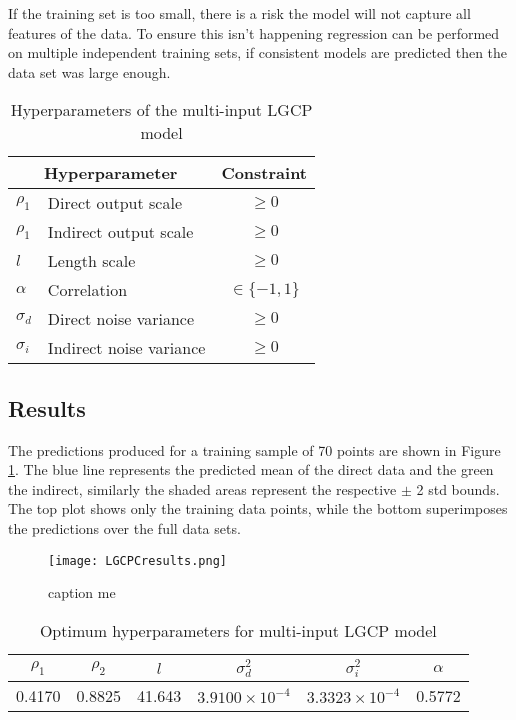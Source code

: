\documentclass[a4paper,11pt]{report}
\begin{document}
If the training set is too small, there is a risk the model will not capture all features of the data. To ensure this isn't happening regression can be performed on multiple independent training sets, if consistent models are predicted then the data set was large enough.


\begin{table}[]
\centering
\caption{Hyperparameters of the multi-input LGCP model}
\label{LGCPChyperparameters}
\begin{tabular}{ll|c}
\multicolumn{2}{c|}{\textbf{Hyperparameter}} & \textbf{Constraint} \\ \hline
\(\rho_1\)           & Direct output scale             & \(\geq0\)            \\
\(\rho_1\)             & Indirect output scale           & \(\geq0\)            \\
\(l\)          & Length scale                    & \(\geq0\)            \\
\(\alpha\)             & Correlation                     &  \(\in\{-1,1\}\)                   \\
\(\sigma_d\)             & Direct noise variance           &    \(\geq0\)                 \\
\(\sigma_i\)           & Indirect noise variance         &     \(\geq0\)               
\end{tabular}
\end{table}

\subsection{Results}
The predictions produced for a training sample of 70 points are shown in Figure \ref{fig:LGCPCresults}. The blue line represents the predicted mean of the direct data and the green the indirect, similarly the shaded areas represent the respective \(\pm\) 2 std bounds. The top plot shows only the training data points, while the bottom superimposes the predictions over the full data sets. \par

\begin{figure}
\centering
\texttt{[image: LGCPCresults.png]}
\caption{caption me}
\label{fig:LGCPCresults}
\end{figure}

\begin{table}[]
\centering
\caption{Optimum hyperparameters for multi-input LGCP model}
\label{LGCPChyper}
\begin{tabular}{|c|c|c|c|c|c|}
\hline
\multicolumn{1}{|c|}{\(\rho_1\)} & \multicolumn{1}{c|}{\(\rho_2\)} & \(l\)                      & \(\sigma_d^2\)            & \(\sigma_i^2\)            & \(\alpha\) \\ \hline
0.4170                            & 0.8825                           & \multicolumn{1}{c|}{41.643} & \(3.9100 \times 10^{-4}\) & \(3.3323 \times 10^{-4}\) & 0.5772     \\ \hline
\end{tabular}
\end{table}
\end{document}
